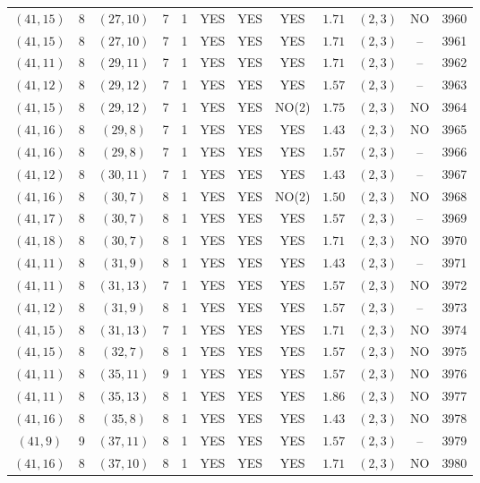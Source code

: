\begin{longtable}{|c|c|c|c|c|c|c|c|c|c|c|c|}
$(41,15)$ & 8 & $(27,10)$ & 7 & 1 & YES & YES & YES & $1.71$ & $(2,3)$ & NO & 3960\\
$(41,15)$ & 8 & $(27,10)$ & 7 & 1 & YES & YES & YES & $1.71$ & $(2,3)$ & -- & 3961\\
$(41,11)$ & 8 & $(29,11)$ & 7 & 1 & YES & YES & YES & $1.71$ & $(2,3)$ & -- & 3962\\
$(41,12)$ & 8 & $(29,12)$ & 7 & 1 & YES & YES & YES & $1.57$ & $(2,3)$ & -- & 3963\\
$(41,15)$ & 8 & $(29,12)$ & 7 & 1 & YES & YES & NO(2) & $1.75$ & $(2,3)$ & NO & 3964\\
$(41,16)$ & 8 & $(29,8)$ & 7 & 1 & YES & YES & YES & $1.43$ & $(2,3)$ & NO & 3965\\
$(41,16)$ & 8 & $(29,8)$ & 7 & 1 & YES & YES & YES & $1.57$ & $(2,3)$ & -- & 3966\\
$(41,12)$ & 8 & $(30,11)$ & 7 & 1 & YES & YES & YES & $1.43$ & $(2,3)$ & -- & 3967\\
$(41,16)$ & 8 & $(30,7)$ & 8 & 1 & YES & YES & NO(2) & $1.50$ & $(2,3)$ & NO & 3968\\
$(41,17)$ & 8 & $(30,7)$ & 8 & 1 & YES & YES & YES & $1.57$ & $(2,3)$ & -- & 3969\\
$(41,18)$ & 8 & $(30,7)$ & 8 & 1 & YES & YES & YES & $1.71$ & $(2,3)$ & NO & 3970\\
$(41,11)$ & 8 & $(31,9)$ & 8 & 1 & YES & YES & YES & $1.43$ & $(2,3)$ & -- & 3971\\
$(41,11)$ & 8 & $(31,13)$ & 7 & 1 & YES & YES & YES & $1.57$ & $(2,3)$ & NO & 3972\\
$(41,12)$ & 8 & $(31,9)$ & 8 & 1 & YES & YES & YES & $1.57$ & $(2,3)$ & -- & 3973\\
$(41,15)$ & 8 & $(31,13)$ & 7 & 1 & YES & YES & YES & $1.71$ & $(2,3)$ & NO & 3974\\
$(41,15)$ & 8 & $(32,7)$ & 8 & 1 & YES & YES & YES & $1.57$ & $(2,3)$ & NO & 3975\\
$(41,11)$ & 8 & $(35,11)$ & 9 & 1 & YES & YES & YES & $1.57$ & $(2,3)$ & NO & 3976\\
$(41,11)$ & 8 & $(35,13)$ & 8 & 1 & YES & YES & YES & $1.86$ & $(2,3)$ & NO & 3977\\
$(41,16)$ & 8 & $(35,8)$ & 8 & 1 & YES & YES & YES & $1.43$ & $(2,3)$ & NO & 3978\\
$(41,9)$ & 9 & $(37,11)$ & 8 & 1 & YES & YES & YES & $1.57$ & $(2,3)$ & -- & 3979\\
$(41,16)$ & 8 & $(37,10)$ & 8 & 1 & YES & YES & YES & $1.71$ & $(2,3)$ & NO & 3980\\

\end{longtable}
